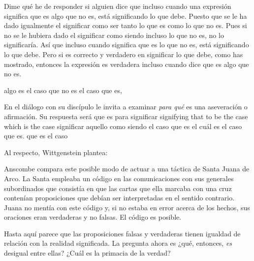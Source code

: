 Dime qué he de responder si alguien dice que incluso cuando una expresión
significa que es algo que no es, está significando lo que debe. Puesto que se le
ha dado igualmente el significar como ser tanto lo que es como lo que no es.
Pues si no se le hubiera dado el significar como siendo incluso lo que no es, no
lo significaría. Así que incluso cuando significa que es lo que no es, está
significando lo que debe. Pero si es correcto y verdadero en significar lo que
debe, como has mostrado, entonces la expresión es verdadera incluso cuando dice
que es algo que no es.

algo es el caso que no es el caso que es,

En el diálogo con su discípulo le invita a examinar \emph{para qué} es
una aseveración o afirmación. Su respuesta será que es para significar
signifying that to be the case which is the case
significar aquello como siendo el caso que es el cuál es el caso que es.
que es
el caso


Al respecto, Wittgenstein plantea:

Anscombe compara este posible modo de actuar a una táctica de Santa Juana de
Arco. La Santa empleaba un código en las comunicaciones con sus generales
subordinados que consistía en que las cartas que ella marcaba con una cruz
contenían proposiciones que debían ser interpretadas en el sentido contrario.
Juana no mentía con este código y, si no estaba en error acerca de los hechos,
sus oraciones eran verdaderas y no falsas. El código es posible.

Hasta aquí parece que las proposiciones falsas y verdaderas tienen igualdad de
relación con la realidad significada. La pregunta ahora es ¿qué, entonces,
\emph{es} desigual entre ellas? ¿Cuál es la primacia de la verdad?
